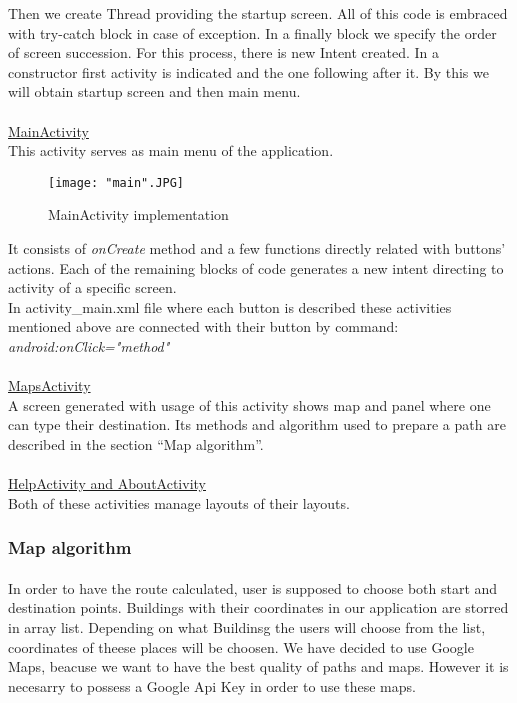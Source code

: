 \documentclass[12pt]{article}
\begin{document}
Then we create Thread providing the startup screen. All of this code is embraced with try-catch block in case of exception.
In a finally block we specify the order of screen succession. For this process, there is new Intent created.
In a constructor first activity is indicated and the one following after it. By this we will obtain startup screen and then main menu.

\paragraph{}
\underline{MainActivity}\\
This activity serves as main menu of the application.

\begin{figure}[H]
\centerline{\texttt{[image: "main".JPG]}}
\caption{MainActivity implementation}
\label{fig:menuImplementation}
\end{figure}

It consists of \textit{onCreate} method and a few functions directly related with buttons' actions.
Each of the remaining blocks of code generates a new intent directing to activity of a specific screen. \\
In activity\_main.xml file where each button is described these activities mentioned above are connected with their button by command:
\textit{android:onClick="method"}

\paragraph{}
\underline{MapsActivity}\\
A screen generated with usage of this activity shows map and panel where one can type their destination. Its methods and algorithm used to prepare a path are described in the section ``Map algorithm''.

\paragraph{}
\underline{HelpActivity and AboutActivity}\\
Both of these activities manage layouts of their layouts.
 

\subsubsection{Map algorithm}

\paragraph{}
In order to have the route calculated, user is supposed to choose both start and destination points. Buildings with their coordinates in our application are storred in array list. Depending on what Buildinsg the users will choose from the list, coordinates of theese places will be choosen. We have decided to use Google Maps, beacuse we want to have the best quality of paths and maps. However it is necesarry to possess a Google Api Key in order to use these maps.
\end{document}
